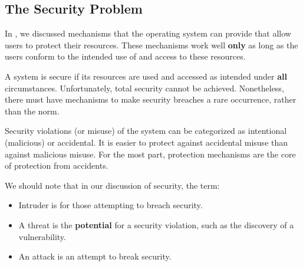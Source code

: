 \subsection{The Security Problem}\label{subsec:Security_Problem}
In , we discussed mechanisms that the operating system can provide that allow users to protect their resources.
These mechanisms work well \textbf{only} as long as the users conform to the intended use of and access to these resources.

A system is secure if its resources are used and accessed as intended under \textbf{all} circumstances.
Unfortunately, total security cannot be achieved.
Nonetheless, there must have mechanisms to make security breaches a rare occurrence, rather than the norm.

Security violations (or misuse) of the system can be categorized as intentional (malicious) or accidental.
It is easier to protect against accidental misuse than against malicious misuse.
For the most part, protection mechanisms are the core of protection from accidents.

We should note that in our discussion of security, the term:
\begin{itemize}[noitemsep]
\item Intruder is for those attempting to breach security.
\item A threat is the \textbf{potential} for a security violation, such as the discovery of a vulnerability.
\item An attack is an attempt to break security.
\end{itemize}

